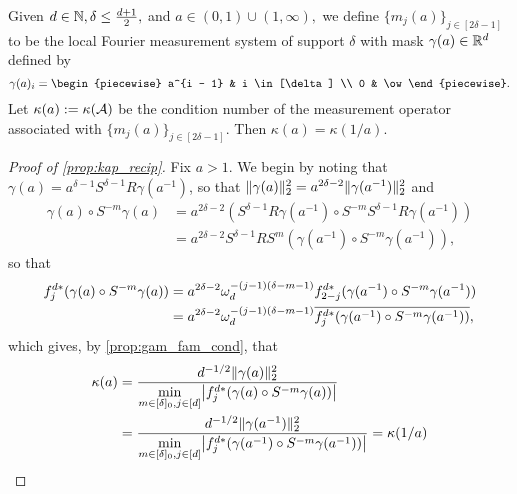 \begin{proposition}
  Given $d \in \mathbb{N}, \delta \le \frac{d + 1}{2},$ and $a \in (0, 1) \cup (1, \infty),$ we define $\{m_j(a)\}_{j \in [2 \delta - 1]}$ to be the local Fourier measurement system of support $\delta$ with mask $\gamma(a) \in \mathbb{R}^d$ defined by \[\gamma(a)_i = \begin{piecewise} a^{i - 1} & i \in [\delta] \\ 0 & \ow \end{piecewise}.\]  Let $\kappa(a) := \kappa(\mathcal{A})$ be the condition number of the measurement operator associated with $\{m_j(a)\}_{j \in [2 \delta - 1]}$.  Then $\kappa(a) = \kappa(1 / a)$.
  \label{prop:kap_recip}
\end{proposition}

\begin{proof}[Proof of \cref{prop:kap_recip}]
  Fix $a > 1$.  We begin by noting that $\gamma(a) = a^{\delta - 1} S^{\delta - 1} R \gamma(a^{-1})$, so that $\lVert\gamma(a)\rVert_2^2 = a^{2 \delta - 2} \lVert\gamma(a^{-1})\rVert_2^2$ and
  \begin{align*}
    \gamma(a) \circ S^{-m} \gamma(a) &= a^{2 \delta - 2} \left(S^{\delta - 1} R \gamma(a^{-1}) \circ S^{-m} S^{\delta - 1} R \gamma(a^{-1})\right) \\
    &= a^{2 \delta - 2} S^{\delta - 1} R S^m (\gamma(a^{-1}) \circ S^{-m} \gamma(a^{-1})),
  \end{align*}
  so that
  \begin{align*}
    f_j^{d *} (\gamma(a) \circ S^{-m} \gamma(a)) &= a^{2 \delta - 2} \omega_d^{-(j - 1) (\delta - m - 1)} f_{2 - j}^{d *} (\gamma(a^{-1}) \circ S^{-m} \gamma(a^{-1})) \\
    &= a^{2 \delta - 2} \omega_d^{-(j - 1) (\delta - m - 1)} \overline{f_j^{d *} (\gamma(a^{-1}) \circ S^{-m} \gamma(a^{-1}))},
  \end{align*}
  which gives, by \cref{prop:gam_fam_cond}, that
  \begin{align*}
    \kappa(a) &= \dfrac{d^{-1/2} \norm{\gamma(a)}_2^2}{\min\limits_{m \in [\delta]_0, j \in [d]} \abs*{f_j^{d*} (\gamma(a) \circ S^{-m} \gamma(a))}} \\ %
    &= \dfrac{d^{-1/2} \norm{\gamma(a^{-1})}_2^2}{\min\limits_{m \in [\delta]_0, j \in [d]} \abs*{f_j^{d*} (\gamma(a^{-1}) \circ S^{-m} \gamma(a^{-1}))}} = \kappa(1 / a)
  \end{align*}  
\end{proof}

